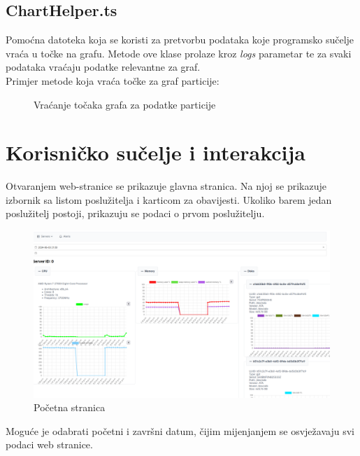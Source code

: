 \documentclass[zavrsnirad]{fer}
\begin{document}
\section{ChartHelper.ts}
Pomoćna datoteka koja se koristi za pretvorbu podataka koje programsko sučelje vraća u točke na grafu. Metode ove klase prolaze kroz \textit{logs} parametar te za svaki podataka vraćaju podatke relevantne za graf.
\\Primjer metode koja vraća točke za graf particije:
\begin{figure}[htb]
	\centering
	
	\caption{Vraćanje točaka grafa za podatke particije}
\end{figure}
\FloatBarrier

\chapter{Korisničko sučelje i interakcija}
Otvaranjem web-stranice se prikazuje glavna stranica. Na njoj se prikazuje izbornik sa listom poslužitelja i karticom za obavijesti. Ukoliko barem jedan poslužitelj postoji, prikazuju se podaci o prvom poslužitelju.
\begin{figure}[htb]
	\centering
	\includegraphics[width=1\linewidth]{images/web_1.png} 
	\caption{Početna stranica}
\end{figure}
\FloatBarrier
Moguće je odabrati početni i završni datum, čijim mijenjanjem se osvježavaju svi podaci web stranice.
\end{document}
